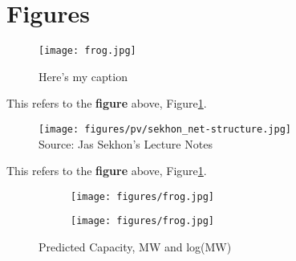 \section{Figures}\label{figure}



\begin{figure}[H]
	\centering %
	\texttt{[image: frog.jpg]}
	\caption{Here's my caption} %
	\label{fig:frog}
\end{figure}

This refers to the \textbf{ figure} above, Figure\ref{fig:frog}.


\begin{figure}[H]  %
\centering
\texttt{[image: figures/pv/sekhon\_net-structure.jpg]}\\
\tiny{Source: Jas Sekhon's Lecture Notes}
\end{figure}

This refers to the \textbf{ figure} above, Figure\ref{fig:frog}.

\begin{figure}[H]
\centering
\begin{subfigure}{.5\textwidth}
  \centering
  \texttt{[image: figures/frog.jpg]}
\end{subfigure}%
\begin{subfigure}{.5\textwidth}
  \centering
  \texttt{[image: figures/frog.jpg]}
\end{subfigure}
\caption{Predicted Capacity, MW and log(MW)}
\label{fig:pred-capacity-hists}
\end{figure}
